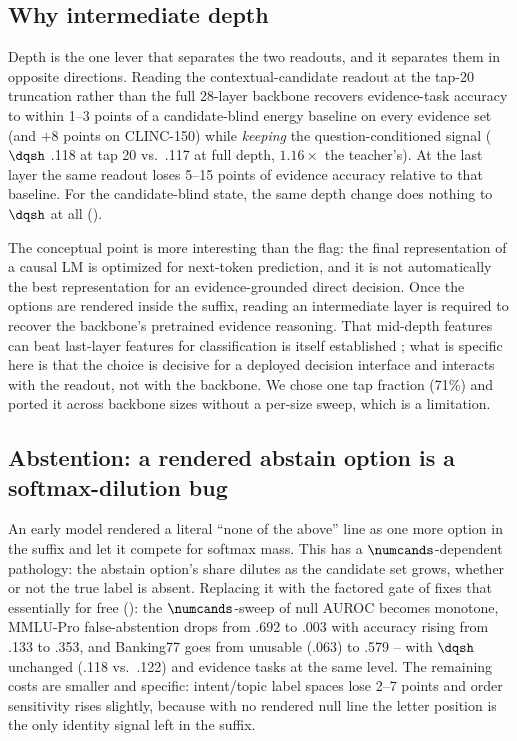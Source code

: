 \subsection{Why intermediate depth}
\label{sec:repr:depth}

Depth is the one lever that separates the two readouts, and it separates them in opposite directions.
Reading the contextual-candidate readout at the tap-20 truncation rather than the full 28-layer backbone
recovers evidence-task accuracy to within 1--3 points of a candidate-blind energy baseline on every
evidence set (and $+8$ points on CLINC-150) while \emph{keeping} the question-conditioned signal ($\dqsh$
.118 at tap 20 vs.\ .117 at full depth, $1.16\times$ the teacher's). At the last layer the same readout
loses 5--15 points of evidence accuracy relative to that baseline. For the candidate-blind state, the
same depth change does nothing to $\dqsh$ at all ().

The conceptual point is more interesting than the flag: the final representation of a causal LM is
optimized for next-token prediction, and it is not automatically the best representation for an
evidence-grounded direct decision. Once the options are rendered inside the suffix, reading an
intermediate layer is required to recover the backbone's pretrained evidence reasoning. That
mid-depth features can beat last-layer features for classification is itself established
\citep{gromov2024deeperlayers,men2024shortgpt,tenney2019pipeline,belrose2023tunedlens}; what is specific
here is that the choice is decisive for a deployed decision interface and interacts with the readout,
not with the backbone. We chose one tap fraction (71\%) and ported it across backbone sizes without a
per-size sweep, which is a limitation.

\subsection{Abstention: a rendered abstain option is a softmax-dilution bug}
\label{sec:repr:null}

An early model rendered a literal ``none of the above'' line as one more option in the suffix and let it
compete for softmax mass. This has a $\numcands$-dependent pathology: the abstain option's share
dilutes as the candidate set grows, whether or not the true label is absent. Replacing it with the
factored gate of  fixes that essentially for free (): the
$\numcands$-sweep of null AUROC becomes monotone, MMLU-Pro false-abstention drops from .692 to .003 with
accuracy rising from .133 to .353, and Banking77 goes from unusable (.063) to .579 -- with $\dqsh$
unchanged (.118 vs.\ .122) and evidence tasks at the same level. The remaining costs are smaller and
specific: intent/topic label spaces lose 2--7 points and order sensitivity rises slightly, because with
no rendered null line the letter position is the only identity signal left in the suffix.

